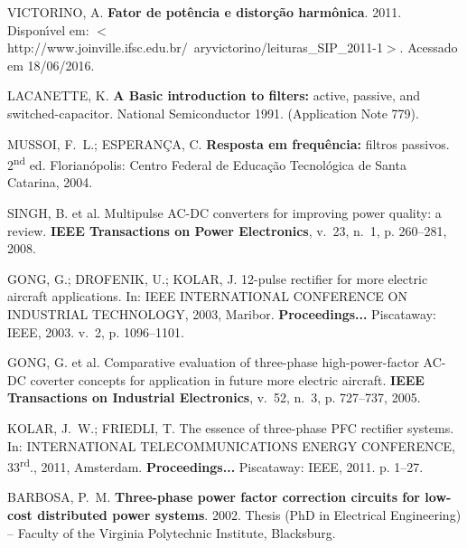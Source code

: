 \begin{thebibliography}{}
{VICTORINO, A. \textbf{Fator de pot\^encia e distor\c{c}\~ao harm\^onica}. 2011.
	Dispon{\'\i}vel em:
	$<$http://www.joinville.ifsc.edu.br/~aryvictorino/leituras\_SIP\_2011-1$>$. 
	Acessado em 18/06/2016.}


{LACANETTE, K. \textbf{A Basic introduction to filters:} active, passive, and
  switched-capacitor. National Semiconductor 1991. (Application Note 779).}

{MUSSOI, F.~L.; ESPERAN{\c{C}}A, C. \textbf{Resposta em frequ{\^e}ncia:} filtros
  passivos.
2\textsuperscript{nd} ed. Florian{\'o}polis: Centro Federal de Educa{\c{c}}{\~a}o
  Tecnol{\'o}gica de Santa Catarina, 2004.}

{SINGH, B. et al. Multipulse {AC-DC} converters for improving power quality: a
  review.
\textbf{IEEE Transactions on Power Electronics}, v.~23, n.~1, p. 260--281,
  2008.}

{GONG, G.; DROFENIK, U.; KOLAR, J. 12-pulse rectifier for more electric
  aircraft applications. In: \uppercase{IEEE International Conference on
  Industrial Technology}, 2003, Maribor. \textbf{Proceedings...} 
  Piscataway: IEEE, 2003. v.~2, p. 1096--1101.}

{GONG, G. et al. Comparative evaluation of three-phase high-power-factor
  {AC-DC} coverter concepts for application in future more electric aircraft.
\textbf{IEEE Transactions on Industrial Electronics}, v.~52, n.~3, p.
  727--737, 2005.}

{KOLAR, J.~W.; FRIEDLI, T. The essence of three-phase {PFC} rectifier systems.
  In: \uppercase{International Telecommunications Energy
  Conference}, 33\textsuperscript{\lowercase{rd}}., 2011, Amsterdam. \textbf{Proceedings...} 
  Piscataway: IEEE, 2011. p. 1--27.}

{BARBOSA, P.~M.
\textbf{Three-phase power factor correction circuits for low-cost distributed
  power systems}. 2002. Thesis (PhD in Electrical Engineering) -- Faculty of the Virginia Polytechnic Institute, Blacksburg.}


\end{thebibliography}
